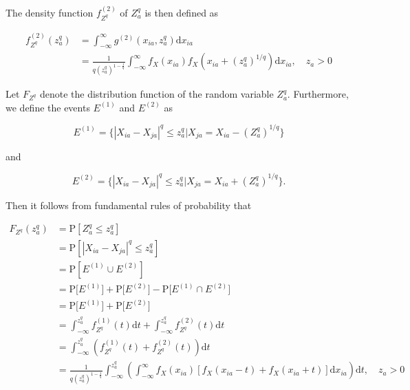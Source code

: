 \documentclass[10pt,letterpaper]{article}\usepackage[]{graphicx}\usepackage[]{color}
\begin{document}
\begin{itemize}
The density function $f^{(2)}_{Z^q}$ of $Z^q_a$ is then defined as

\begin{equation}
\begin{aligned}
f^{(2)}_{Z^q}(z^q_a) &= \int_{-\infty}^{\infty} g^{(2)}(x_{ia},z^q_a)\text{d}x_{ia} \\
&= \frac{1}{q \left(z^q_a\right)^{1 - \frac{1}{q}}}\int_{-\infty}^{\infty} f_X(x_{ia})f_X\left(x_{ia}+\left(z^q_a\right)^{1/q}\right)\text{d}x_{ia}, \quad z_a > 0
\end{aligned}
\end{equation}
\end{itemize}

Let $F_{Z^q}$ denote the distribution function of the random variable $Z^q_a$. Furthermore, we define the events $E^{(1)}$ and $E^{(2)}$ as

\begin{equation}\label{eq:E(1)}
E^{(1)} = \bigl\{|X_{ia}-X_{ja}|^q \leq z^q_a | X_{ja} = X_{ia} - \left(Z^q_a\right)^{1/q}\bigr\}
\end{equation}

\noindent and

\begin{equation}\label{eq:E(2)}
E^{(2)} = \bigl\{|X_{ia}-X_{ja}|^q \leq z^q_a | X_{ja} = X_{ia} + \left(Z^q_a\right)^{1/q}\bigr\}.
\end{equation}

Then it follows from fundamental rules of probability that

\begin{equation}\label{eq:DqCDF}
\begin{aligned}
F_{Z^q}(z^q_a) &= \text{P}\left[Z^q_a \leq z^q_a\right] \\
&= \text{P}\left[|X_{ia} - X_{ja}|^q \leq z^q_a\right] \\
&= \text{P}\left[E^{(1)} \cup E^{(2)}\right] \\
&= \text{P}\bigl[E^{(1)}\bigr] + \text{P}\bigl[E^{(2)}\bigr] - \text{P}\bigl[E^{(1)} \cap E^{(2)}\bigr] \\
&= \text{P}\bigl[E^{(1)}\bigr] + \text{P}\bigl[E^{(2)}\bigr] \\
&= \int_{-\infty}^{z^q_a} f^{(1)}_{Z^q}(t) \text{d}t + \int_{-\infty}^{z^q_a} f^{(2)}_{Z^q}(t) \text{d}t \\
&= \int_{-\infty}^{z^q_a} \left(f^{(1)}_{Z^q}(t) + f^{(2)}_{Z^q}(t)\right) \text{d}t \\
&= \frac{1}{q \left(z^q_a\right)^{1 - \frac{1}{q}}}\int_{-\infty}^{z^q_a} \left(\int_{-\infty}^{\infty}f_X(x_{ia})\left[f_X(x_{ia} - t) + f_X(x_{ia} + t)\right] \text{d}x_{ia}\right)\text{d}t, \quad z_a > 0
\end{aligned}
\end{equation}
\end{document}

